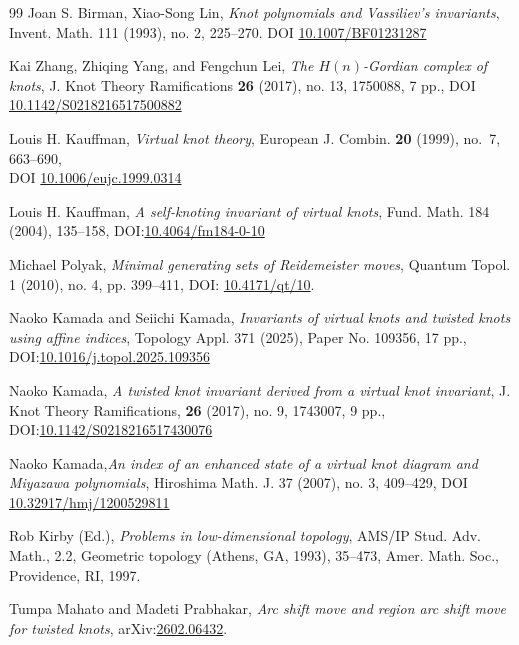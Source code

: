 \documentclass[10pt,a4paper,reqno]{amsart}
\theoremstyle{definition}
\theoremstyle{remark}
\begin{document}
\begin{thebibliography}{99}
Joan S. Birman, Xiao-Song Lin, {\it Knot polynomials and Vassiliev's invariants}, Invent. Math. 111 (1993), no. 2, 225--270.
DOI \href{10.1007/BF01231287}{10.1007/BF01231287}

Kai Zhang, Zhiqing Yang, and Fengchun Lei, {\it The $H(n)$-Gordian complex of knots}, J. Knot Theory Ramifications \textbf{26} (2017), no. 13, 1750088, 7 pp.,
DOI \href{https://doi.org/10.1142/S0218216517500882}{10.1142/S0218216517500882}


	Louis H. Kauffman, \textit{Virtual knot theory}, European J. Combin. \textbf{20} (1999), no.~7, 663--690,\\
	DOI \href{https://doi.org/10.1006/eujc.1999.0314}{10.1006/eujc.1999.0314}
	
	Louis H. Kauffman,
	\textit{A self-knoting invariant of virtual knots}, Fund. Math. 184 (2004), 135--158, DOI:\href{https://doi.org/10.4064/fm184-0-10}{10.4064/fm184-0-10}

Michael Polyak, {\it Minimal generating sets of Reidemeister moves}, Quantum Topol. 1 (2010), no. 4, pp. 399–411, DOI: \href{https://doi.org/10.4171/qt/10}{10.4171/qt/10}.

	Naoko Kamada and Seiichi Kamada, \textit{Invariants of virtual knots and twisted knots using affine indices}, Topology Appl. 371 (2025), Paper No. 109356, 17 pp.,\\ DOI:\href{https://doi.org/10.1016/j.topol.2025.109356}{10.1016/j.topol.2025.109356}
	
	Naoko Kamada, \textit{A twisted knot invariant derived from a virtual knot invariant},
	J. Knot Theory Ramifications, \textbf{26} (2017), no. 9, 1743007, 9 pp., DOI:\href{https://doi.org/10.1142/S0218216517430076}{10.1142/S0218216517430076}
	
	 Naoko Kamada,{\it  An index of an enhanced state of a virtual knot diagram and Miyazawa polynomials}, Hiroshima Math. J. 37 (2007), no. 3, 409--429,
	  DOI \href{10.32917/hmj/1200529811}{10.32917/hmj/1200529811}
	 
Rob Kirby (Ed.), {\it Problems in low-dimensional topology},  AMS/IP Stud. Adv. Math., 2.2, Geometric topology (Athens, GA, 1993), 35--473, Amer. Math. Soc., Providence, RI, 1997.

	Tumpa Mahato and Madeti Prabhakar, \textit{Arc shift move and region arc shift move for twisted knots},
	arXiv:\href{https://arxiv.org/abs/2602.06432}{2602.06432}.
	

\end{thebibliography}
\end{document}
